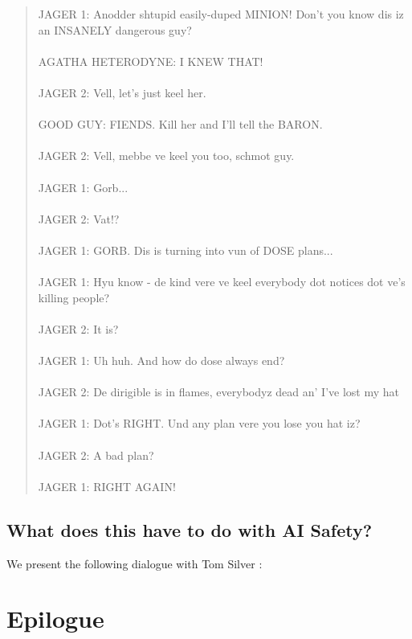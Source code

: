\documentclass{article}
\begin{document}
\begin{quote}
  JAGER 1: Anodder shtupid easily-duped MINION! Don't you know dis iz
  an INSANELY dangerous guy?\\
  \\
  AGATHA HETERODYNE: I KNEW THAT!\\
  \\
  JAGER 2: Vell, let's just keel her.\\
  \\
  GOOD GUY: FIENDS. Kill her and I'll tell the BARON.\\
  \\
  JAGER 2: Vell, mebbe ve keel you too, schmot guy.\\
  \\
  JAGER 1: Gorb...\\
  \\
  JAGER 2: Vat!?\\
  \\
  JAGER 1: GORB. Dis is turning into vun of DOSE plans...\\
  \\
  JAGER 1: Hyu know - de kind vere ve keel everybody dot notices dot
  ve's killing people?\\
  \\
  JAGER 2: It is?\\
  \\
  JAGER 1: Uh huh. And how do dose always end?\\
  \\
  JAGER 2: De dirigible is in flames, everybodyz dead an' I've lost my
  hat\\
  \\
  JAGER 1: Dot's RIGHT. Und any plan vere you lose you hat iz?\\
  \\
  JAGER 2: A bad plan?\\
  \\
  JAGER 1: RIGHT AGAIN!\\ 
\end{quote}

\subsection{What does this have to do with AI Safety?}

We present the following dialogue with Tom Silver \cite{tom}:



\section{Epilogue}
\end{document}
